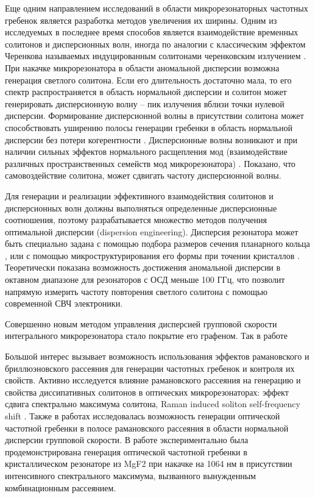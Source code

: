 Еще одним направлением исследований в области микрорезонаторных частотных гребенок является разработка методов увеличения их ширины. Одним из исследуемых в последнее время способов является взаимодействие временных солитонов и дисперсионных волн, иногда по аналогии с классическим эффектом Черенкова называемых индуцированным  солитонами черенковским излучением \cite{Akhmediev1995,Barashenkov2011,Milian2014}. При накачке микрорезонатора в области аномальной дисперсии возможна генерация светлого солитона. Если его длительность достаточно мала, то его спектр распространяется в область нормальной дисперсии и солитон может генерировать дисперсионную волну – пик излучения вблизи точки нулевой дисперсии. Формирование дисперсионной волны в присутствии солитона может способствовать уширению полосы генерации гребенки в область нормальной дисперсии без потери когерентности \cite{Brasch2016,Jang2014,Pfeiffer:17}. Дисперсионные волны возникают и при наличии сильных эффектов нормального расщепления мод (взаимодействие различных пространственных семейств мод микрорезонатора) \cite{Yang2016,Matsko:16}. Показано, что самовоздействие солитона, может сдвигать частоту дисперсионной волны.

Для генерации и реализации эффективного взаимодействия солитонов и дисперсионных волн должны выполняться определенные дисперсионные соотношения, поэтому разрабатывается множество методов получения оптимальной дисперсии (dispersion engineering). Дисперсия резонатора может быть специально задана с помощью подбора размеров сечения планарного кольца \cite{Okawachi2014,Pfeiffer:17}, или с помощью микроструктурирования его формы при точении кристаллов \cite{Grudinin2012,Grudinin2015,Nakagawa2016}. Теоретически показана возможность достижения аномальной дисперсии в октавном диапазоне для резонаторов с ОСД меньше 100 ГГц, что позволит напрямую измерить частоту повторения светлого солитона с помощью современной СВЧ электроники.

Совершенно новым методом управления дисперсией групповой скорости интегрального микрорезонатора стало покрытие его графеном. Так в работе 

Большой интерес вызывает возможность использования эффектов рамановского и бриллюэновского рассеяния для генерации частотных гребенок и контроля их свойств. Активно исследуется влияние рамановского рассеяния на генерацию и свойства диссипативных солитонов в оптических микрорезонаторах: эффект сдвига спектрально максимума солитона, Raman induced soliton self-frequency shift \cite{Hansson2014ol,Milian2015,Yi2016,Karpov2016,Bao2017}. Также в работах \cite{Chembo2015,Chembo2016} исследовалась возможность генерации оптической частотной гребенки в полосе рамановского рассеяния в области нормальной дисперсии групповой скорости. В работе \cite{Chembo2015} экспериментально была продемонстрирована генерация оптической частотной гребенки в кристаллическом резонаторе из MgF2 при накачке на 1064 нм в присутствии интенсивного спектрального максимума, вызванного вынужденным комбинационным рассеянием. 

